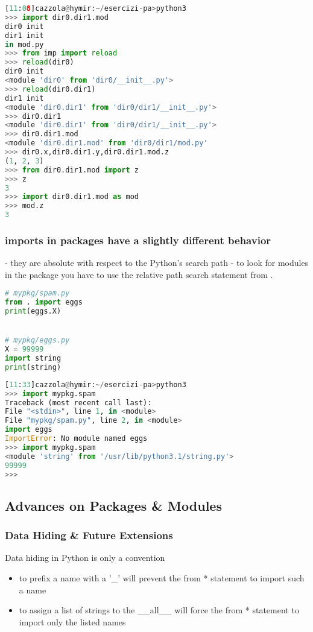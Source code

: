 \begin{lstlisting}[language=Python]
[11:08]cazzola@hymir:~/esercizi-pa>python3
>>> import dir0.dir1.mod
dir0 init
dir1 init
in mod.py
>>> from imp import reload
>>> reload(dir0)
dir0 init
<module 'dir0' from 'dir0/__init__.py'>
>>> reload(dir0.dir1)
dir1 init
<module 'dir0.dir1' from 'dir0/dir1/__init__.py'>
>>> dir0.dir1
<module 'dir0.dir1' from 'dir0/dir1/__init__.py'>
>>> dir0.dir1.mod
<module 'dir0.dir1.mod' from 'dir0/dir1/mod.py'
>>> dir0.x,dir0.dir1.y,dir0.dir1.mod.z
(1, 2, 3)
>>> from dir0.dir1.mod import z
>>> z
3
>>> import dir0.dir1.mod as mod
>>> mod.z
3
\end{lstlisting}

\subsubsection{imports in packages have a slightly different behavior}

- they are absolute with respect to the Python’s search path
- to look for modules in the package you have to use the relative path search statement from .

\begin{lstlisting}[language=Python]
# mypkg/spam.py
from . import eggs
print(eggs.X)


# mypkg/eggs.py
X = 99999
import string
print(string)
\end{lstlisting}

\begin{lstlisting}[language=Python]
[11:33]cazzola@hymir:~/esercizi-pa>python3
>>> import mypkg.spam
Traceback (most recent call last):
File "<stdin>", line 1, in <module>
File "mypkg/spam.py", line 2, in <module>
import eggs
ImportError: No module named eggs
>>> import mypkg.spam
<module 'string' from '/usr/lib/python3.1/string.py'>
99999
>>>
\end{lstlisting}

\subsection{Advances on Packages \& Modules}

\subsubsection{Data Hiding \& Future Extensions}

Data hiding in Python is only a convention

\begin{itemize}
  \item to prefix a name with a '\_' will prevent the from * statement to import such a name
\item to assign a list of strings to the \_\_all\_\_ will force the from * statement to import only the listed names
\end{itemize}

